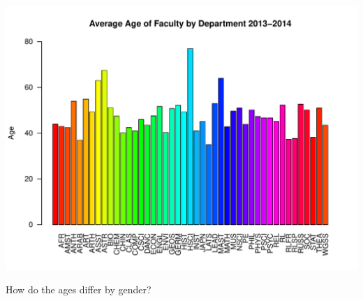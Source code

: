 \documentclass[12pt,a4paper]{article}\usepackage[]{graphicx}\usepackage[]{color}
\makeatletter
\def\maxwidth{ %
  \ifdim\Gin@nat@width>\linewidth
    \linewidth
  \else
    \Gin@nat@width
  \fi
}
\newenvironment{knitrout}{}{} %
\theoremstyle{definition}
\makeatother
\begin{document}
\begin{knitrout}
\includegraphics[width=\maxwidth]{figure/unnamed-chunk-10-10} 

\end{knitrout}

\bigskip
How do the ages differ by gender?
\end{document}
